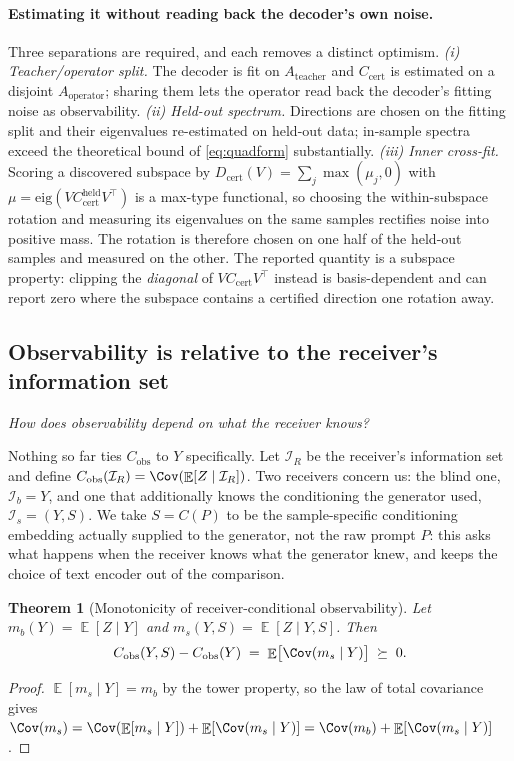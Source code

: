 \documentclass{article}
\newtheorem{theorem}{Theorem}
\theoremstyle{definition}
\DeclareMathOperator{\Exp}{\mathbb{E}}
\newcommand{\Cobs}{C_{\mathrm{obs}}}
\newcommand{\Ccert}{C_{\mathrm{cert}}}
\newcommand{\Dcert}{D_{\mathrm{cert}}}
\begin{document}
\paragraph{Estimating it without reading back the decoder's own noise.}
Three separations are required, and each removes a distinct optimism.
\emph{(i) Teacher/operator split.} The decoder is fit on $A_{\mathrm{teacher}}$ and
$\Ccert$ is estimated on a disjoint $A_{\mathrm{operator}}$; sharing them lets the
operator read back the decoder's fitting noise as observability.
\emph{(ii) Held-out spectrum.} Directions are chosen on the fitting split and their
eigenvalues re-estimated on held-out data; in-sample spectra exceed the theoretical bound
of \eqref{eq:quadform} substantially.
\emph{(iii) Inner cross-fit.} Scoring a discovered subspace by
$\Dcert(V)=\sum_j\max(\mu_j,0)$ with $\mu=\mathrm{eig}(V\Ccert^{\mathrm{held}}V^\top)$ is a
max-type functional, so choosing the within-subspace rotation and measuring its eigenvalues
on the same samples rectifies noise into positive mass. The rotation is therefore chosen on
one half of the held-out samples and measured on the other.
The reported quantity is a subspace property: clipping the \emph{diagonal} of
$V\Ccert V^\top$ instead is basis-dependent and can report zero where the subspace contains
a certified direction one rotation away.

\subsection{Observability is relative to the receiver's information set}
\label{sec:receiver}

\emph{How does observability depend on what the receiver knows?}

Nothing so far ties $\Cobs$ to $Y$ specifically. Let $\mathcal I_R$ be the receiver's
information set and define $\Cobs(\mathcal I_R)=\Cov(\Exp[Z\mid\mathcal I_R])$. Two
receivers concern us: the blind one, $\mathcal I_b=Y$, and one that additionally knows the
conditioning the generator used, $\mathcal I_s=(Y,S)$. We take $S=C(P)$ to be the
sample-specific conditioning embedding actually supplied to the generator, not the raw
prompt $P$: this asks what happens when the receiver knows what the generator knew, and
keeps the choice of text encoder out of the comparison.

\begin{theorem}[Monotonicity of receiver-conditional observability]
\label{thm:mono}
Let $m_b(Y)=\Exp[Z\mid Y]$ and $m_s(Y,S)=\Exp[Z\mid Y,S]$. Then
\[
  \Cobs(Y,S)-\Cobs(Y)\;=\;\Exp\bigl[\Cov(m_s\mid Y)\bigr]\;\succeq\;0 .
\]
\end{theorem}
\begin{proof}
$\Exp[m_s\mid Y]=m_b$ by the tower property, so the law of total covariance gives
$\Cov(m_s)=\Cov(\Exp[m_s\mid Y])+\Exp[\Cov(m_s\mid Y)]=\Cov(m_b)+\Exp[\Cov(m_s\mid Y)]$.
\end{proof}
\end{document}
